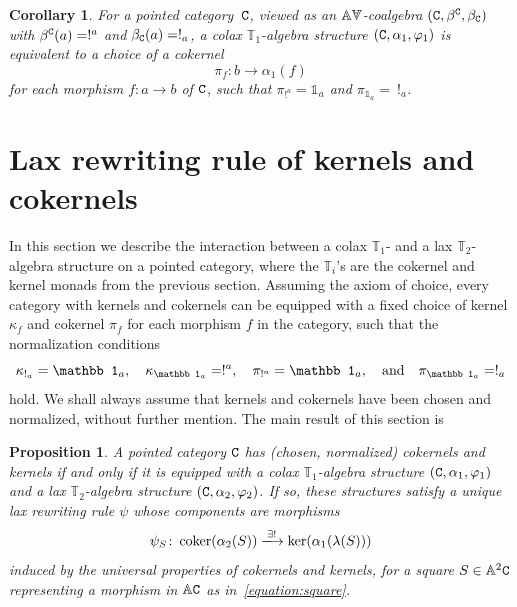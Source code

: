 \documentclass[12pt,leqno]{amsart}
\newtheorem{corollary}[theorem]{Corollary}
\newtheorem{proposition}[theorem]{Proposition}
\theoremstyle{definition}
\def\T{\mathbb{T}}
\def\Ar{\mathbb{A}}
\def\id{{\mathbb 1}}
\newcommand{\C}{{\tt C}}
\newcommand{\eK}{\alpha_2}%
\newcommand{\eC}{\alpha_1}%
\newcommand{\4}{\texttt{4}}
\newcommand{\Vr}{\text{\raisebox{\depth}{\scalebox{1}[-1]{$\Ar$}}}}
\DeclareMathOperator{\coker}{coker}
\renewcommand{\phi}{\varphi}
\begin{document}
\begin{corollary}
\label{corollary:T_1_cokernels}
For a pointed category \,$\C$, viewed as an $\Ar\Vr$-coalgebra
$(\C,\beta^\C,\beta_\C)$ with $\beta^\C(a)=!^a$ and $\beta_\C(a)=!_a$,
a colax $\T_1$-algebra structure $(\C,\eC,\phi_1)$ is equivalent to a
choice of a cokernel 
\[
\pi_f\colon b\rightarrow \eC (f)
\] 
for each morphism $f\colon a \to b$ of\/ $\C$, such that $\pi_{!^a}=\id_a$ and
$\pi_{\id_a}=\ !_a$.
\end{corollary} 

\section{Lax rewriting rule of kernels and cokernels}
\label{section:ker_coker}

In this section we describe the interaction between a colax $\T_1$- and a
lax $\T_2$-algebra structure on a pointed category, where the $\T_i$'s
are the cokernel and kernel monads from the previous section. Assuming
the axiom of choice, every category with kernels and cokernels can be
equipped with a fixed choice of kernel $\kappa_f$ and cokernel $\pi_f$
for each morphism $f$ in the category, such that the normalization
conditions
\[
\kappa_{!_a}=\id_a,\quad \kappa_{\id_a}=!^a,\quad
\pi_{!^a}=\id_a,\quad
\hbox {and} \quad  \pi_{\id_a}=!_a
\] 
hold. We shall always 
assume that kernels and cokernels have been
chosen and normalized, without further mention.                                  
The main result of this section is

\begin{proposition}
\label{proposition:pre-abelian}
A pointed category $\C$ has (chosen, normalized) cokernels and kernels
if and only if it is equipped with a colax
$\T_1$-algebra structure $(\C,\eC,\phi_1)$ and a lax $\T_2$-algebra
structure $(\C,\alpha_2,\phi_2)$. If so, these structures satisfy a
unique lax rewriting rule $\psi$ whose components are morphisms
\[
\psi_S\colon \coker(\eK(S))\xlongrightarrow{\exists!}
\ker(\eC(\lambda(S)))
\]
induced by the universal properties of 
cokernels and kernels, for a square $S \in \Ar^2\C$ representing a
morphism in $\Ar\C$ as in~\eqref{equation:square}.
\end{proposition}
\end{document}
